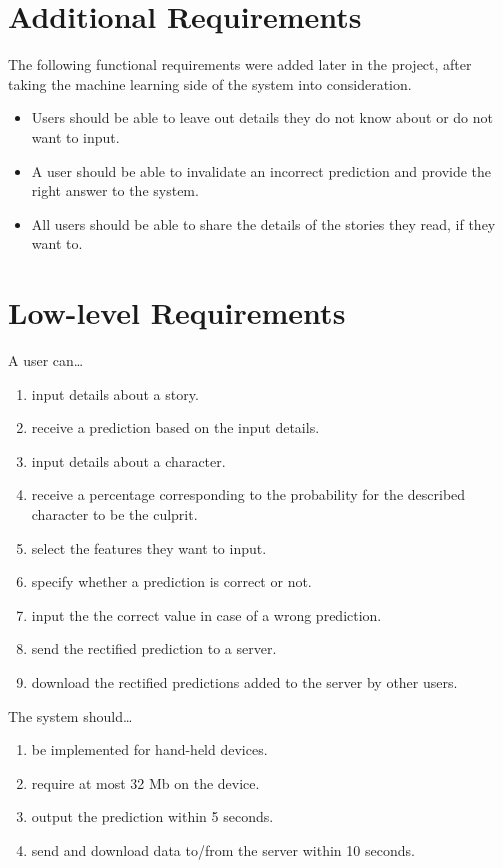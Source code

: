 \documentclass{mproj}
\begin{document}
\section{Additional Requirements}
	
The following functional requirements were added later in the project, after taking the machine learning side of the system into consideration.
\begin{itemize}[topsep=0pt]
\item Users should be able to leave out details they do not know about or do not want to input.
\item A user should be able to invalidate an incorrect prediction and provide the right answer to the system. 
\item All users should be able to share the details of the stories they read, if they want to.
\end{itemize}

\section{Low-level Requirements}\label{requirements}
	
A user can\ldots
\begin{enumerate}[topsep=0pt]\label{user_stories}
	\item input details about a story.
	\item receive a prediction based on the input details.
	\item input details about a character.
	\item receive a percentage corresponding to the probability for the described character to be the culprit.
	\item select the features they want to input.
	\item specify whether a prediction is correct or not.
	\item input the the correct value in case of a wrong prediction.
	\item send the rectified prediction to a server.
	\item download the rectified predictions added to the server by other users. \par
\end{enumerate}

The system should\ldots
\begin{enumerate}[topsep=0pt]\label{constraints}
	\item be implemented for hand-held devices.
	\item require at most 32 Mb on the device.
	\item output the prediction within 5 seconds.
	\item send and download data to/from the server within 10 seconds.
\end{enumerate}
\end{document}

